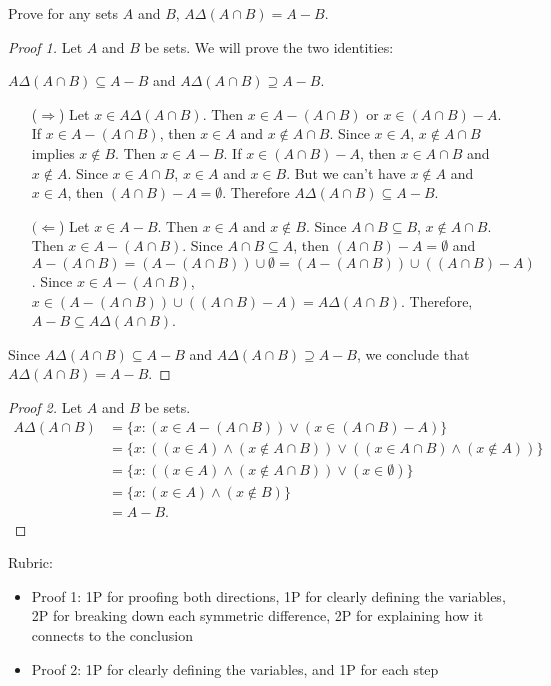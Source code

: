 \documentclass{article}
\theoremstyle{definition}
\begin{document}
\begin{question}{6}
   Prove for any sets $A$ and $B$, $A\Delta (A\cap B) = A-B$.
\end{question}
\begin{solution}
\begin{proof}[Proof 1]
Let $A$ and $B$ be sets. We will prove the two identities: 

$A\Delta (A\cap B) \subseteq A-B$ and $A\Delta (A\cap B) \supseteq A-B$.
\begin{itemize}
\item[($\Rightarrow$)] Let $x\in A\Delta (A\cap B)$. Then $x\in A-(A\cap B)$ or $x\in(A\cap B)-A$. If $x\in A-(A\cap B)$, then $x\in A$ and $x\notin A\cap B$. Since $x\in A$, $x\notin A\cap B$ implies $x\notin B$. Then $x\in A-B$. If $x\in(A\cap B)-A$, then $x\in A\cap B$ and $x\notin A$. Since $x\in A\cap B$, $x\in A$ and $x\in B$. But we can't have $x\notin A$ and $x\in A$, then $(A\cap B)-A = \emptyset$. Therefore $A\Delta (A\cap B) \subseteq A-B$.

\item[$(\Leftarrow$)] Let $x\in A-B$. Then $x\in A$ and $x\notin B$. Since $A\cap B\subseteq B$, $x\notin A\cap B$. Then $x\in A-(A\cap B)$. Since $A\cap B\subseteq A$, then $(A\cap B)- A=\emptyset$ and $A-(A\cap B) = (A-(A\cap B))\cup \emptyset = (A-(A\cap B))\cup ((A\cap B)- A)$. Since $x\in A-(A\cap B)$, $x\in (A-(A\cap B))\cup ((A\cap B)- A) = A\Delta (A\cap B)$. Therefore, $A-B \subseteq A\Delta (A\cap B)$.

\end{itemize}
Since $A\Delta (A\cap B) \subseteq A-B$ and $A\Delta (A\cap B) \supseteq A-B$, we conclude that $A\Delta (A\cap B) = A-B$.
\end{proof}
\begin{proof}[Proof 2]
Let $A$ and $B$ be sets.
\begin{align*}
A\Delta (A\cap B) &= \{ x : (x\in A-(A\cap B)) \vee (x\in (A\cap B)-A)\}\\
& = \{ x : ((x\in A) \wedge (x\notin A\cap B)) \vee ((x\in A\cap B)\wedge (x\notin A))\}\\
& = \{ x : ((x\in A) \wedge (x\notin A\cap B)) \vee (x\in \emptyset)\}\\
& = \{ x : (x\in A) \wedge (x\notin B) \}\\
&=A-B.
\end{align*}
\end{proof}
{\color{red} Rubric:
\begin{itemize}
\item Proof 1: 1P for proofing both directions, 1P for clearly defining the variables, 2P for breaking down each symmetric difference, 2P for explaining how it connects to the conclusion
\item Proof 2: 1P for clearly defining the variables, and 1P for each step
\end{itemize}}
\end{solution}
\end{document}
